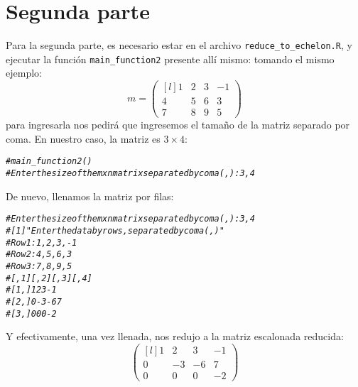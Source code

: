 \documentclass{article}\usepackage[]{graphicx}\usepackage[]{color}
\makeatletter
\newcommand{\hlcom}[1]{\textcolor[rgb]{0.678,0.584,0.686}{\textit{#1}}}%
\newenvironment{kframe}{%
 \def\at@end@of@kframe{}%
 \ifinner\ifhmode%
  \def\at@end@of@kframe{\end{minipage}}%
  \begin{minipage}{\columnwidth}%
 \fi\fi%
 \def\FrameCommand##1{\hskip\@totalleftmargin \hskip-\fboxsep
 \colorbox{shadecolor}{##1}\hskip-\fboxsep
     \hskip-\linewidth \hskip-\@totalleftmargin \hskip\columnwidth}%
 \MakeFramed {\advance\hsize-\width
   \@totalleftmargin\z@ \linewidth\hsize
   \@setminipage}}%
 {\par\unskip\endMakeFramed%
 \at@end@of@kframe}
\newenvironment{knitrout}{}{} %
\makeatother
\begin{document}
\section*{Segunda parte}
Para la segunda parte, es necesario estar en el archivo \texttt{reduce\_to\_echelon.R}, y ejecutar la función \texttt{main\_function2} presente allí mismo:
tomando el mismo ejemplo:
\begin{equation*}
m=
\begin{pmatrix*}[l]
1 & 2 & 3 & -1\\
4 & 5 & 6 & 3\\
7 & 8 & 9 & 5
\end{pmatrix*}
\end{equation*}
para ingresarla nos pedirá que ingresemos el tamaño de la matriz separado por coma. En nuestro caso, la matriz es $3\times 4$:
\begin{knitrout}
\color{fgcolor}\begin{kframe}
\begin{alltt}
\hlcom{# main_function2()}
\hlcom{# Enter the size of the mxn matrix separated by coma (,):3,4}
\end{alltt}
\end{kframe}
\end{knitrout}
De nuevo, llenamos la matriz por filas:
\begin{knitrout}
\color{fgcolor}\begin{kframe}
\begin{alltt}
\hlcom{# Enter the size of the mxn matrix separated by coma (,):3,4}
\hlcom{# [1] "Enter the data by rows, separated by coma (,)"}
\hlcom{# Row 1: 1,2,3,-1}
\hlcom{# Row 2: 4,5,6,3}
\hlcom{# Row 3: 7,8,9,5}
\hlcom{#      [,1] [,2] [,3] [,4]}
\hlcom{# [1,]    1    2    3   -1}
\hlcom{# [2,]    0   -3   -6    7}
\hlcom{# [3,]    0    0    0   -2}
\end{alltt}
\end{kframe}
\end{knitrout}
Y efectivamente, una vez llenada, nos redujo a la matriz escalonada reducida:
\begin{equation*}
\begin{pmatrix*}[l]
1 & 2 & 3 & -1\\
0 & -3 & -6 & 7\\
0 & 0 & 0 & -2
\end{pmatrix*}
\end{equation*}
\end{document}
